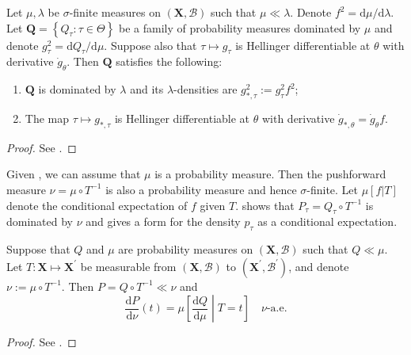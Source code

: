 \begin{theorem}
\label{thm--hellinger-diff-unaffected-by-dom}
Let \(\mu, \lambda\) be \(\sigma\)-finite measures on \((\mathbf{X},
\mathcal{B})\) such that \(\mu \ll \lambda\).
Denote \(f^{2} = \mathrm{d} \mu / \mathrm{d} \lambda\).
Let \(\mathbf{Q} = \left\{ Q_{\tau} : \tau \in \Theta \right\}\) be a family
of probability measures dominated by \(\mu\) and denote \(g_{\tau}^{2} =
\mathrm{d} Q_{\tau} / \mathrm{d} \mu\).
Suppose also that \(\tau \mapsto g_{\tau}\) is Hellinger differentiable at
\(\theta\) with derivative \(\dot{g}_{\theta}\).
Then \(\mathbf{Q}\) satisfies the following:
\begin{enumerate}[label=(\alph*)]
  \item \label{thm--hellinger-diff-unaffected-by-dom-rn-chain-rule}
    \(\mathbf{Q}\) is dominated by \(\lambda\) and its \(\lambda\)-densities
    are \(g_{\ast, \tau}^{2} := g_{\tau}^{2} f^{2}\);
  \item \label{thm--hellinger-diff-unaffected-by-dom-derivative-def}
    The map \(\tau \mapsto g_{\ast, \tau}\) is Hellinger differentiable at
    \(\theta\) with derivative \(\dot{g}_{\ast, \theta} =
    \dot{g}_{\theta} f\).
\end{enumerate}
\end{theorem}

\begin{proof}
See .
\end{proof}

Given
, we can assume that \(\mu\) is a
probability measure.
Then the pushforward measure \(\nu = \mu \circ T^{- 1}\) is also a
probability measure and hence \(\sigma\)-finite.
Let \(\mu [f | T]\) denote the conditional expectation of \(f\) given \(T\).
 shows that \(P_{\tau} = Q_{\tau} \circ T^{-
1}\) is dominated by \(\nu\) and gives a form for the density \(p_{\tau}\) as a
conditional expectation.

\begin{theorem}
\label{thm--density-preservation}
Suppose that \(Q\) and \(\mu\) are probability measures on \((\mathbf{X},
\mathcal{B})\) such that \(Q \ll \mu\).
Let \(T : \mathbf{X} \mapsto \mathbf{X}^{\prime}\) be measurable from
\((\mathbf{X}, \mathcal{B})\) to \(\left( \mathbf{X}^{\prime},
\mathcal{B}^{\prime} \right)\), and denote \(\nu := \mu \circ T^{- 1}\).
Then \(P = Q \circ T^{- 1} \ll \nu\) and
\begin{equation}
  \frac{\mathrm{d} P}{\mathrm{d} \nu} (t) = \mu \left[ \frac{\mathrm{d}
  Q}{\mathrm{d} \mu} \middle| T = t \right] \quad \nu\text{-a.e}.
  \label{eqn--density-preservation}
\end{equation}
\end{theorem}

\begin{proof}
See .
\end{proof}

